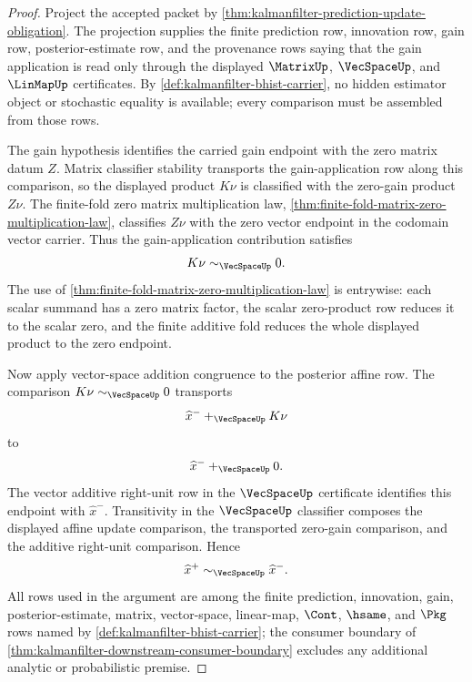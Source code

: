 \begin{proof}
Project the accepted packet by \autoref{thm:kalmanfilter-prediction-update-obligation}. The projection supplies the finite prediction row, innovation row, gain row, posterior-estimate row, and the provenance rows saying that the gain application is read only through the displayed $\MatrixUp$, $\VecSpaceUp$, and $\LinMapUp$ certificates. By \autoref{def:kalmanfilter-bhist-carrier}, no hidden estimator object or stochastic equality is available; every comparison must be assembled from those rows.

The gain hypothesis identifies the carried gain endpoint with the zero matrix datum $Z$. Matrix classifier stability transports the gain-application row along this comparison, so the displayed product $K\nu$ is classified with the zero-gain product $Z\nu$. The finite-fold zero matrix multiplication law, \autoref{thm:finite-fold-matrix-zero-multiplication-law}, classifies $Z\nu$ with the zero vector endpoint in the codomain vector carrier. Thus the gain-application contribution satisfies
$$
K\nu\sim_{\VecSpaceUp}0.
$$
The use of \autoref{thm:finite-fold-matrix-zero-multiplication-law} is entrywise: each scalar summand has a zero matrix factor, the scalar zero-product row reduces it to the scalar zero, and the finite additive fold reduces the whole displayed product to the zero endpoint.

Now apply vector-space addition congruence to the posterior affine row. The comparison $K\nu\sim_{\VecSpaceUp}0$ transports
$$
\widehat{x}^{-}+_{\VecSpaceUp}K\nu
$$
to
$$
\widehat{x}^{-}+_{\VecSpaceUp}0.
$$
The vector additive right-unit row in the $\VecSpaceUp$ certificate identifies this endpoint with $\widehat{x}^{-}$. Transitivity in the $\VecSpaceUp$ classifier composes the displayed affine update comparison, the transported zero-gain comparison, and the additive right-unit comparison. Hence
$$
\widehat{x}^{+}\sim_{\VecSpaceUp}\widehat{x}^{-}.
$$
All rows used in the argument are among the finite prediction, innovation, gain, posterior-estimate, matrix, vector-space, linear-map, $\Cont$, $\hsame$, and $\Pkg$ rows named by \autoref{def:kalmanfilter-bhist-carrier}; the consumer boundary of \autoref{thm:kalmanfilter-downstream-consumer-boundary} excludes any additional analytic or probabilistic premise.
\end{proof}
